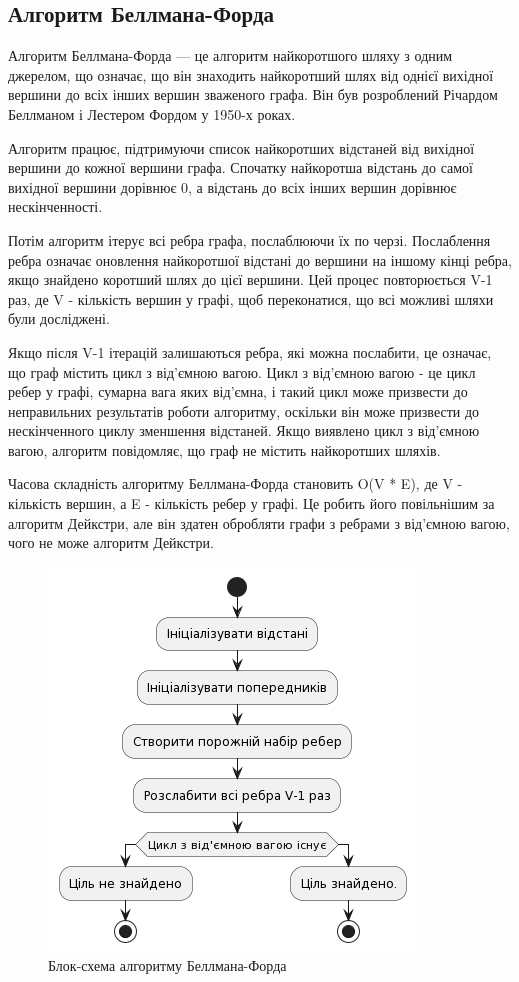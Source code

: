 \subsection{Алгоритм Беллмана-Форда}
\label{subsec:bellman-ford-subsection}

Алгоритм Беллмана-Форда --- це алгоритм найкоротшого шляху з одним джерелом, що означає, що він знаходить найкоротший шлях від однієї вихідної вершини до всіх інших вершин зваженого графа. Він був розроблений Річардом Беллманом і Лестером Фордом у 1950-х роках.

Алгоритм працює, підтримуючи список найкоротших відстаней від вихідної вершини до кожної вершини графа. Спочатку найкоротша відстань до самої вихідної вершини дорівнює 0, а відстань до всіх інших вершин дорівнює нескінченності.

Потім алгоритм ітерує всі ребра графа, послаблюючи їх по черзі. Послаблення ребра означає оновлення найкоротшої відстані до вершини на іншому кінці ребра, якщо знайдено коротший шлях до цієї вершини. Цей процес повторюється V-1 раз, де V - кількість вершин у графі, щоб переконатися, що всі можливі шляхи були досліджені.

Якщо після V-1 ітерацій залишаються ребра, які можна послабити, це означає, що граф містить цикл з від'ємною вагою. Цикл з від'ємною вагою - це цикл ребер у графі, сумарна вага яких від'ємна, і такий цикл може призвести до неправильних результатів роботи алгоритму, оскільки він може призвести до нескінченного циклу зменшення відстаней. Якщо виявлено цикл з від'ємною вагою, алгоритм повідомляє, що граф не містить найкоротших шляхів.

Часова складність алгоритму Беллмана-Форда становить O(V * E), де V - кількість вершин, а E - кількість ребер у графі. Це робить його повільнішим за алгоритм Дейкстри, але він здатен обробляти графи з ребрами з від'ємною вагою, чого не може алгоритм Дейкстри.\\

\begin{figure}[!htp]
    \centering
    \includegraphics[scale=0.7]{content/chapters/2-implementation-methods/assets/img/bellman-ford_algorithm.png}
    \caption{Блок-схема алгоритму Беллмана-Форда}
    \label{fig:bellman-ford}
\end{figure}

